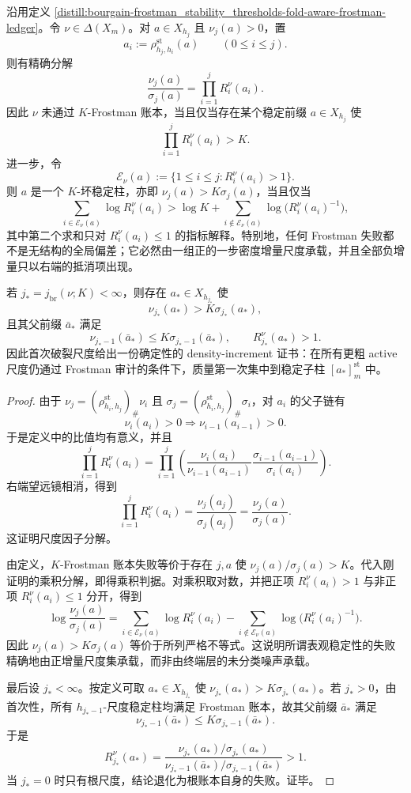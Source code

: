 \begin{theorem}\label{distill:bourgain-frostman_stability_thresholds-multiscale-density-increment-classification}
沿用定义 \ref{distill:bourgain-frostman_stability_thresholds-fold-aware-frostman-ledger}。令 \(\nu\in\Delta(X_m)\)。对 \(a\in X_{h_j}\) 且 \(\nu_j(a)>0\)，置
\[
a_i:=\rho^{\mathrm{st}}_{h_j,h_i}(a)
\qquad(0\le i\le j).
\]
则有精确分解
\[
\frac{\nu_j(a)}{\sigma_j(a)}=\prod_{i=1}^{j}R_i^\nu(a_i).
\]
因此 \(\nu\) 未通过 \(K\)-Frostman 账本，当且仅当存在某个稳定前缀 \(a\in X_{h_j}\) 使
\[
\prod_{i=1}^{j}R_i^\nu(a_i)>K.
\]
进一步，令
\[
\mathcal E_\nu(a):=\{1\le i\le j:R_i^\nu(a_i)>1\}.
\]
则 \(a\) 是一个 \(K\)-坏稳定柱，亦即 \(\nu_j(a)>K\sigma_j(a)\)，当且仅当
\[
\sum_{i\in\mathcal E_\nu(a)}\log R_i^\nu(a_i)
>
\log K+\sum_{i\notin\mathcal E_\nu(a)}\log\bigl(R_i^\nu(a_i)^{-1}\bigr),
\]
其中第二个求和只对 \(R_i^\nu(a_i)\le1\) 的指标解释。特别地，任何 Frostman 失败都不是无结构的全局偏差；它必然由一组正的一步密度增量尺度承载，并且全部负增量只以右端的抵消项出现。

若 \(j_\ast=j_{\mathrm{br}}(\nu;K)<\infty\)，则存在 \(a_\ast\in X_{h_{j_\ast}}\) 使
\[
\nu_{j_\ast}(a_\ast)>K\sigma_{j_\ast}(a_\ast),
\]
且其父前缀 \(\bar a_\ast\) 满足
\[
\nu_{j_\ast-1}(\bar a_\ast)\le K\sigma_{j_\ast-1}(\bar a_\ast),
\qquad
R_{j_\ast}^\nu(a_\ast)>1.
\]
因此首次破裂尺度给出一份确定性的 density-increment 证书：在所有更粗 active 尺度仍通过 Frostman 审计的条件下，质量第一次集中到稳定子柱 \([a_\ast]^{\mathrm{st}}_m\) 中。
\end{theorem}
\begin{proof}
由于 \(\nu_j=(\rho^{\mathrm{st}}_{h_i,h_j})_\#\nu_i\) 且 \(\sigma_j=(\rho^{\mathrm{st}}_{h_i,h_j})_\#\sigma_i\)，对 \(a_i\) 的父子链有
\[
\nu_i(a_i)>0\Longrightarrow \nu_{i-1}(a_{i-1})>0.
\]
于是定义中的比值均有意义，并且
\[
\prod_{i=1}^{j}R_i^\nu(a_i)
=\prod_{i=1}^{j}
\left(
\frac{\nu_i(a_i)}{\nu_{i-1}(a_{i-1})}
\frac{\sigma_{i-1}(a_{i-1})}{\sigma_i(a_i)}
\right).
\]
右端望远镜相消，得到
\[
\prod_{i=1}^{j}R_i^\nu(a_i)=\frac{\nu_j(a_j)}{\sigma_j(a_j)}=\frac{\nu_j(a)}{\sigma_j(a)}.
\]
这证明尺度因子分解。

由定义，\(K\)-Frostman 账本失败等价于存在 \(j,a\) 使 \(\nu_j(a)/\sigma_j(a)>K\)。代入刚证明的乘积分解，即得乘积判据。对乘积取对数，并把正项 \(R_i^\nu(a_i)>1\) 与非正项 \(R_i^\nu(a_i)\le1\) 分开，得到
\[
\log\frac{\nu_j(a)}{\sigma_j(a)}
=\sum_{i\in\mathcal E_\nu(a)}\log R_i^\nu(a_i)
-\sum_{i\notin\mathcal E_\nu(a)}\log\bigl(R_i^\nu(a_i)^{-1}\bigr).
\]
因此 \(\nu_j(a)>K\sigma_j(a)\) 等价于所列严格不等式。这说明所谓表观稳定性的失败精确地由正增量尺度集承载，而非由终端层的未分类噪声承载。

最后设 \(j_\ast<\infty\)。按定义可取 \(a_\ast\in X_{h_{j_\ast}}\) 使 \(\nu_{j_\ast}(a_\ast)>K\sigma_{j_\ast}(a_\ast)\)。若 \(j_\ast>0\)，由首次性，所有 \(h_{j_\ast-1}\)-尺度稳定柱均满足 Frostman 账本，故其父前缀 \(\bar a_\ast\) 满足
\[
\nu_{j_\ast-1}(\bar a_\ast)\le K\sigma_{j_\ast-1}(\bar a_\ast).
\]
于是
\[
R_{j_\ast}^\nu(a_\ast)
=\frac{\nu_{j_\ast}(a_\ast)/\sigma_{j_\ast}(a_\ast)}
{\nu_{j_\ast-1}(\bar a_\ast)/\sigma_{j_\ast-1}(\bar a_\ast)}
>1.
\]
当 \(j_\ast=0\) 时只有根尺度，结论退化为根账本自身的失败。证毕。
\end{proof}


